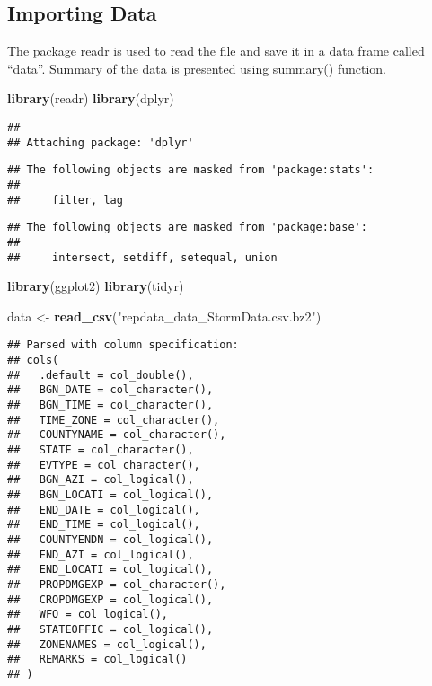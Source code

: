 \documentclass[]{article}
\newenvironment{Shaded}{\begin{snugshade}}{\end{snugshade}}
\newcommand{\KeywordTok}[1]{\textcolor[rgb]{0.13,0.29,0.53}{\textbf{#1}}}
\newcommand{\StringTok}[1]{\textcolor[rgb]{0.31,0.60,0.02}{#1}}
\newcommand{\NormalTok}[1]{#1}
\begin{document}
\subsection{Importing Data}\label{importing-data}

The package readr is used to read the file and save it in a data frame
called ``data''. Summary of the data is presented using summary()
function.

\begin{Shaded}
\begin{Highlighting}[]
\KeywordTok{library}\NormalTok{(readr)}
\KeywordTok{library}\NormalTok{(dplyr)}
\end{Highlighting}
\end{Shaded}

\begin{verbatim}
## 
## Attaching package: 'dplyr'
\end{verbatim}

\begin{verbatim}
## The following objects are masked from 'package:stats':
## 
##     filter, lag
\end{verbatim}

\begin{verbatim}
## The following objects are masked from 'package:base':
## 
##     intersect, setdiff, setequal, union
\end{verbatim}

\begin{Shaded}
\begin{Highlighting}[]
\KeywordTok{library}\NormalTok{(ggplot2)}
\KeywordTok{library}\NormalTok{(tidyr)}

\NormalTok{data <-}\StringTok{ }\KeywordTok{read_csv}\NormalTok{(}\StringTok{"repdata_data_StormData.csv.bz2"}\NormalTok{)}
\end{Highlighting}
\end{Shaded}

\begin{verbatim}
## Parsed with column specification:
## cols(
##   .default = col_double(),
##   BGN_DATE = col_character(),
##   BGN_TIME = col_character(),
##   TIME_ZONE = col_character(),
##   COUNTYNAME = col_character(),
##   STATE = col_character(),
##   EVTYPE = col_character(),
##   BGN_AZI = col_logical(),
##   BGN_LOCATI = col_logical(),
##   END_DATE = col_logical(),
##   END_TIME = col_logical(),
##   COUNTYENDN = col_logical(),
##   END_AZI = col_logical(),
##   END_LOCATI = col_logical(),
##   PROPDMGEXP = col_character(),
##   CROPDMGEXP = col_logical(),
##   WFO = col_logical(),
##   STATEOFFIC = col_logical(),
##   ZONENAMES = col_logical(),
##   REMARKS = col_logical()
## )
\end{verbatim}
\end{document}
